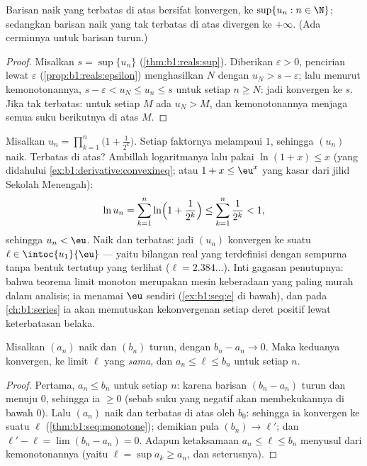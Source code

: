 \begin{theorem}\label{thm:b1:seq:monotone}
Barisan naik yang terbatas di atas bersifat konvergen, ke $\sup\{u_n : n \in
\N\}$; sedangkan barisan naik yang tak terbatas di atas divergen ke
$+\infty$. (Ada  cerminnya untuk barisan
turun.)
\end{theorem}

\begin{proof}
Misalkan $s = \sup\{u_n\}$ (\cref{thm:b1:reals:sup}). Diberikan $\varepsilon >
0$, pencirian lewat $\varepsilon$
(\cref{prop:b1:reals:epsilon}) menghasilkan $N$ dengan $u_N > s -
\varepsilon$; lalu menurut kemonotonannya, $s - \varepsilon < u_N \leq u_n \leq
s$ untuk setiap $n \geq N$: jadi konvergen ke $s$. Jika tak terbatas: untuk setiap
$M$ ada $u_N > M$, dan kemonotonannya menjaga semua suku berikutnya di atas $M$.
\end{proof}

\begin{example}\label{ex:b1:seq:existencemachine}
Misalkan $u_n = \prod_{k=1}^{n} \bigl(1 + \frac{1}{2^k}\bigr)$. Setiap
faktornya melampaui $1$, sehingga $(u_n)$ naik. Terbatas di atas? Ambillah
logaritmanya lalu pakai $\ln(1 + x) \leq x$
(yang didahului \cref{ex:b1:derivative:convexineq}; atau
$1 + x \leq \eu^x$ yang kasar dari jilid Sekolah Menengah):
\[
\ln u_n = \sum_{k=1}^{n} \ln\Bigl(1 + \frac{1}{2^k}\Bigr)
\leq \sum_{k=1}^{n} \frac{1}{2^k} < 1 ,
\]
sehingga $u_n < \eu$. Naik dan terbatas: jadi $(u_n)$ konvergen ke suatu
$\ell \in \intoc{u_1}{\eu}$ --- yaitu bilangan real yang terdefinisi
dengan sempurna tanpa bentuk tertutup yang terlihat ($\ell = 2.384\dots$). Inti
gagasan penutupnya: bahwa teorema limit monoton merupakan mesin keberadaan
yang paling murah dalam analisis; ia menamai $\eu$ sendiri
(\cref{ex:b1:seq:e} di bawah), dan pada \cref{ch:b1:series} ia akan
memutuskan kekonvergenan setiap deret positif lewat keterbatasan belaka.
\end{example}

\begin{theorem}\label{thm:b1:seq:adjacent}
Misalkan $(a_n)$ naik dan $(b_n)$ turun, dengan $b_n - a_n \to
0$. Maka keduanya konvergen, ke limit $\ell$ yang \emph{sama}, dan $a_n
\leq \ell \leq b_n$ untuk setiap $n$.
\end{theorem}

\begin{proof}
Pertama, $a_n \leq b_n$ untuk setiap $n$: karena barisan $(b_n - a_n)$
turun dan menuju $0$, sehingga ia $\geq 0$ (sebab suku yang negatif akan
membekukannya di bawah $0$). Lalu $(a_n)$ naik dan terbatas di atas oleh
$b_0$: sehingga ia konvergen ke suatu $\ell$ (\cref{thm:b1:seq:monotone});
demikian pula $(b_n) \to \ell'$; dan $\ell' - \ell = \lim (b_n - a_n) =
0$. Adapun ketaksamaan $a_n \leq \ell \leq b_n$ menyusul dari
kemonotonannya (yaitu $\ell = \sup a_k \geq a_n$, dan seterusnya).
\end{proof}

